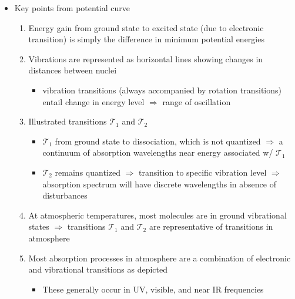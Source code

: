 \documentclass[11pt, oneside]{article}
\begin{document}
\begin{itemize}
	\item[--] Key points from potential curve
	\begin{enumerate}
		\item Energy gain from ground state to excited state (due to electronic transition) is simply the difference in minimum potential energies
		\item Vibrations are represented as horizontal lines showing changes in distances between nuclei
		\begin{itemize}
			\item[$\hookrightarrow$] vibration transitions (always accompanied by rotation transitions) entail change in energy level $\Rightarrow$ range of oscillation
		\end{itemize}
		\item Illustrated transitions $\mathcal{T}_1$ and $\mathcal{T}_2$
		\begin{itemize}
			\item $\mathcal{T}_1$ from ground state to dissociation, which is not quantized $\Rightarrow$ a continuum of absorption wavelengths near energy associated w/ $\mathcal{T}_1$
			\item $\mathcal{T}_2$ remains quantized $\Rightarrow$ transition to specific vibration level $\Rightarrow$ absorption spectrum will have discrete wavelengths in absence of disturbances
		\end{itemize}
		\item At atmospheric temperatures, most molecules are in ground vibrational states $\Rightarrow$ transitions $\mathcal{T}_1$ and $\mathcal{T}_2$ are representative of transitions in atmosphere
		\item Most absorption processes in atmosphere are a combination of electronic and vibrational transitions as depicted
		\begin{itemize}
			\item[$\hookrightarrow$] These generally occur in UV, visible, and near IR frequencies
		\end{itemize}
	\end{enumerate}
\end{itemize}
\end{document}
